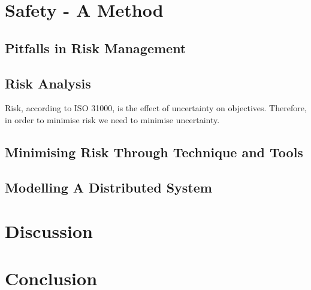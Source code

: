 \section{Safety - A Method}
\subsection{Pitfalls in Risk Management}

\subsection{Risk Analysis}
Risk, according to ISO 31000\cite{}, is the effect of uncertainty on objectives. 
Therefore, in order to minimise risk we need to minimise uncertainty.

\subsection{Minimising Risk Through Technique and Tools}

\subsection{Modelling A Distributed System}

\section{Discussion}

\section{Conclusion}

